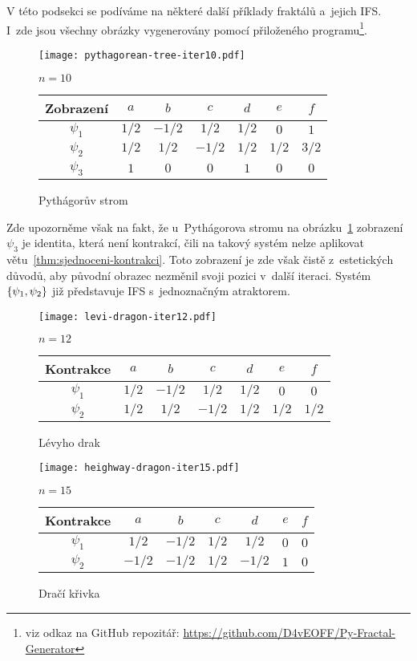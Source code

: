 V této podsekci se podíváme na některé další příklady fraktálů a~jejich IFS. I~zde jsou všechny obrázky vygenerovány pomocí přiloženého programu\footnote{viz odkaz na GitHub repozitář: \url{https://github.com/D4vEOFF/Py-Fractal-Generator}}.
\begin{figure}[H]
    \centering
    \texttt{[image: pythagorean-tree-iter10.pdf]}
    \begin{center}
        $n=10$
    \end{center}
    \begin{tabular}{c|cccccc}
    Zobrazení   & $a$   & $b$   & $c$   & $d$   & $e$   & $f$          \\\hline
    $\psi_1$    & $1/2$ & $-1/2$ & $1/2$ & $1/2$ & $0$   & $1$         \\
    $\psi_2$    & $1/2$ & $1/2$ & $-1/2$ & $1/2$ & $1/2$ & $3/2$         \\
    $\psi_3$    & $1$   & $0$   & $0$   & $1$   & $0$   & $0$         \\
    \end{tabular}
    \caption{Pythágorův strom}
    \label{fig:pythagoruv-strom}
\end{figure}
Zde upozorněme však na fakt, že u~Pythágorova stromu na obrázku~\ref{fig:pythagoruv-strom} zobrazení $\psi_3$ je identita, která není kontrakcí, čili na takový systém nelze aplikovat větu~\ref{thm:sjednoceni-kontrakci}. Toto zobrazení je zde však čistě z~estetických důvodů, aby původní obrazec nezměnil svoji pozici v~další iteraci. Systém $\left\{\psi_1,\psi_2\right\}$ již představuje IFS s~jednoznačným atraktorem.
\begin{figure}[H]
    \centering
    \texttt{[image: levi-dragon-iter12.pdf]}
    \begin{center}
        $n=12$
    \end{center}
    \begin{tabular}{c|cccccc}
    Kontrakce   & $a$   & $b$   & $c$   & $d$   & $e$   & $f$          \\\hline
    $\psi_1$    & $1/2$ & $-1/2$ & $1/2$ & $1/2$ & $0$   & $0$         \\
    $\psi_2$    & $1/2$ & $1/2$ & $-1/2$ & $1/2$ & $1/2$ & $1/2$
    \end{tabular}
    \caption{Lévyho drak}
    \label{fig:levyho-drak}
\end{figure}
\begin{figure}[H]
    \centering
    \texttt{[image: heighway-dragon-iter15.pdf]}
    \begin{center}
        $n=15$
    \end{center}
    \begin{tabular}{c|cccccc}
    Kontrakce   & $a$   & $b$   & $c$   & $d$   & $e$   & $f$          \\\hline
    $\psi_1$    & $1/2$ & $-1/2$ & $1/2$ & $1/2$ & $0$   & $0$         \\
    $\psi_2$    & $-1/2$ & $-1/2$ & $1/2$ & $-1/2$ & $1$ & $0$
    \end{tabular}
    \caption{Dračí křivka}
    \label{fig:draci-krivka}
\end{figure}
